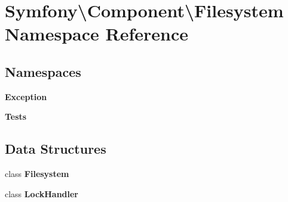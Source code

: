 \section{Symfony\textbackslash{}Component\textbackslash{}Filesystem Namespace Reference}
\label{namespace_symfony_1_1_component_1_1_filesystem}
\subsection*{Namespaces}
\begin{DoxyCompactItemize}
\item 
 {\bf Exception}
\item 
 {\bf Tests}
\end{DoxyCompactItemize}
\subsection*{Data Structures}
\begin{DoxyCompactItemize}
\item 
class {\bf Filesystem}
\item 
class {\bf Lock\+Handler}
\end{DoxyCompactItemize}
